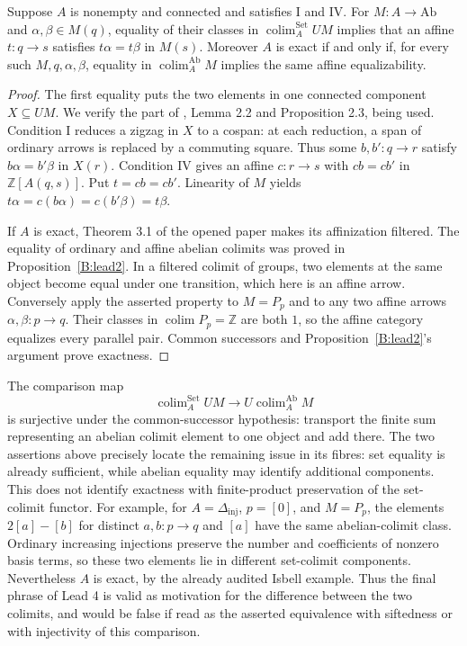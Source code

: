 \begin{proposition}\label{B:lead4}
Suppose $A$ is nonempty and connected and satisfies I and IV.  For
$M:A\to\mathrm{Ab}$ and $\alpha,\beta\in M(q)$, equality of their
classes in $\operatorname{colim}^{\mathrm{Set}}_A UM$ implies that
an affine $t:q\to s$ satisfies $t\alpha=t\beta$ in $M(s)$.
Moreover $A$ is exact if and only if, for every such $M,q,\alpha,\beta$,
equality in $\operatorname{colim}^{\mathrm{Ab}}_A M$ implies the
same affine equalizability.
\end{proposition}
\begin{proof}
The first equality puts the two elements in one connected component
$X\subseteq UM$.  We verify the part of
\cite{IsbellMitchell1976}, Lemma 2.2 and Proposition 2.3, being used.
Condition I reduces a zigzag in $X$ to a cospan: at each reduction, a
span of ordinary arrows is replaced by a commuting square.  Thus some
$b,b':q\to r$ satisfy $b\alpha=b'\beta$ in $X(r)$.
Condition IV gives an affine $c:r\to s$ with $cb=cb'$ in
$\mathbb Z[A(q,s)]$.  Put $t=cb=cb'$.  Linearity of $M$ yields
$t\alpha=c(b\alpha)=c(b'\beta)=t\beta$.

If $A$ is exact, Theorem 3.1 of the opened paper makes its affinization
filtered.  The equality of ordinary and affine abelian colimits was
proved in Proposition~\ref{B:lead2}.  In a filtered colimit of groups,
two elements at the same object become equal under one transition,
which here is an affine arrow.  Conversely apply the asserted property
to $M=P_p$ and to any two affine arrows $\alpha,\beta:p\to q$.
Their classes in $\operatorname{colim}P_p=\mathbb Z$ are both $1$,
so the affine category equalizes every parallel pair.  Common
successors and Proposition~\ref{B:lead2}'s argument prove exactness.
\end{proof}

\begin{remark}\label{B:lead4-scope}
The comparison map
\[
 \operatorname{colim}^{\mathrm{Set}}_A UM\longrightarrow
 U\operatorname{colim}^{\mathrm{Ab}}_A M
\]
is surjective under the common-successor hypothesis: transport the
finite sum representing an abelian colimit element to one object and
add there.  The two assertions above precisely locate the remaining
issue in its fibres: set equality is already sufficient, while abelian
equality may identify additional components.  This does not identify
exactness with finite-product preservation of the set-colimit functor.
For example, for $A=\Delta_{\mathrm{inj}}$, $p=[0]$, and $M=P_p$,
the elements $2[a]-[b]$ for distinct $a,b:p\to q$ and $[a]$ have the
same abelian-colimit class.  Ordinary increasing injections preserve
the number and coefficients of nonzero basis terms, so these two
elements lie in different set-colimit components.  Nevertheless $A$
is exact, by the already audited Isbell example.  Thus the final phrase
of Lead 4 is valid as motivation for the difference between the two
colimits, and would be false if read as the asserted equivalence with
siftedness or with injectivity of this comparison.
\end{remark}

